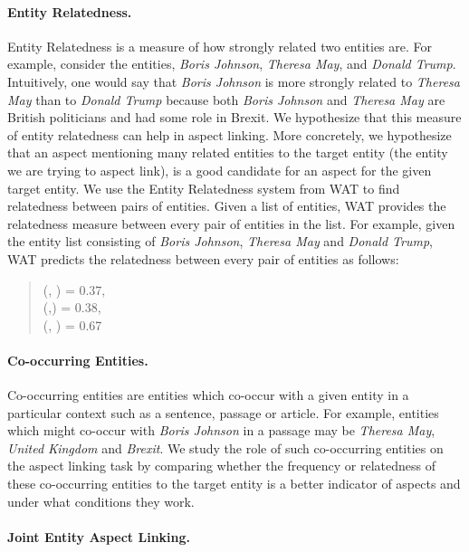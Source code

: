 \paragraph{\textbf{Entity Relatedness. }}
Entity Relatedness is a measure of how strongly related two entities are. For example, consider the entities, \textit{Boris Johnson}, \textit{Theresa May}, and \textit{Donald Trump}. Intuitively, one would say that \textit{Boris Johnson} is more strongly related to \textit{Theresa May} than to \textit{Donald Trump} because both \textit{Boris Johnson} and \textit{Theresa May} are British politicians and had some role in Brexit. We hypothesize that this measure of entity relatedness can help in aspect linking. More concretely, we hypothesize that an aspect mentioning many related entities to the target entity (the entity we are trying to aspect link), is a good candidate for an aspect for the given target entity. 
We use the Entity Relatedness system from WAT \cite{piccinno2014wat} to find relatedness between pairs of entities. Given a list of entities, WAT provides the
relatedness measure between every pair of entities in the list. For example, given the entity list consisting of \textit{Boris Johnson}, \textit{Theresa May} and \textit{Donald Trump}, WAT predicts the relatedness between every pair of entities as follows:
\begin{quote}
    (, ) = 0.37, \\
    (,)    = 0.38, \\
    (, )  = 0.67
\end{quote}

\paragraph{\textbf{Co-occurring Entities.}}
Co-occurring entities are entities which co-occur with a given entity in a particular context such as a sentence, passage or article. For example, entities which might co-occur with \textit{Boris Johnson} in a passage may be \textit{Theresa May}, \textit{United Kingdom} and \textit{Brexit}. We study the role of such co-occurring entities on the aspect linking task by comparing whether the frequency or relatedness of these co-occurring entities to the target entity is a better indicator of aspects and under what conditions they work. 


\paragraph{\textbf{Joint Entity Aspect Linking.}}

